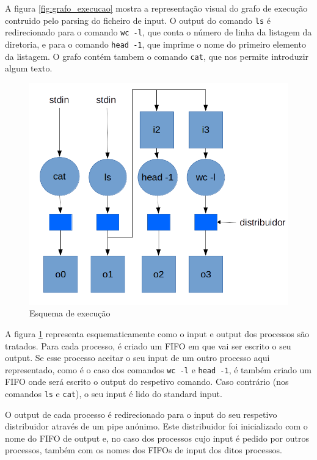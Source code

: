 \documentclass[12pt]{report}
\begin{document}
\break
A figura \ref{fig:grafo_execucao} mostra a representação visual do grafo de execução contruido pelo parsing do ficheiro de input. O output do comando \texttt{ls} é redirecionado para o comando \texttt{wc -l}, que conta o número de linha da listagem da diretoria, e para o comando \texttt{head -1}, que imprime o nome do primeiro elemento da listagem. O grafo contém tambem o comando \texttt{cat}, que nos permite introduzir algum texto.

\begin{figure}
    \includegraphics[width=\linewidth]{esquema_execucao_exemplo.png}
    \caption{Esquema de execução}
    \label{fig:esquema_execucao}
\end{figure}

 A figura \ref{fig:esquema_execucao} representa esquematicamente como o input e output dos processos são tratados. Para cada processo, é criado um FIFO em que vai ser escrito o seu output. Se esse processo aceitar o seu input de um outro processo aqui representado, como é o caso dos comandos \texttt{wc -l} e \texttt{head -1}, é também criado um FIFO onde será escrito o output do respetivo comando. Caso contrário (nos comandos \texttt{ls} e \texttt{cat}), o seu input é lido do standard input.

 O output de cada processo é redirecionado para o input do seu respetivo distribuidor através de um pipe anónimo. Este distribuidor foi inicializado com o nome do FIFO de output e, no caso dos processos cujo input é pedido por outros processos, também com os nomes dos FIFOs de input dos ditos processos.
\end{document}
